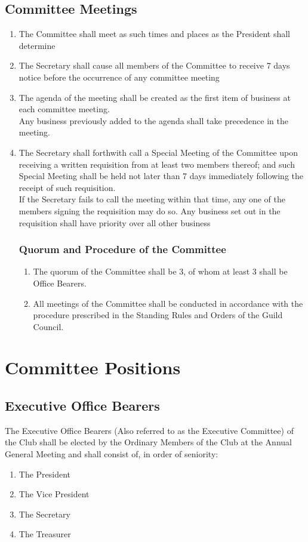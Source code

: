 \documentclass[10pt,a4paper]{report}
\begin{document}
	\section{Committee Meetings}
	\begin{enumerate}[label=\alph*]
		\item The Committee shall meet as such times and places as the President shall determine
		\item The Secretary shall cause all members of the Committee to receive 7 days notice before the occurrence of any committee meeting
		\item The agenda of the meeting shall be created as the first item of business at each committee meeting. \\
		Any business previously added to the agenda shall take precedence in the meeting.
		\item The Secretary shall forthwith call a Special Meeting of the Committee upon receiving a written requisition from at least two members thereof; and such Special Meeting shall be held not later than 7 days immediately following the receipt of such requisition. \\
		If the Secretary fails to call the meeting within that time, any one of the members signing the requisition may do so. Any business set out in the requisition shall have priority over all other business
		\subsection{Quorum and Procedure of the Committee}
		\begin{enumerate}[label=\alph*]
		\item The quorum of the Committee shall be 3, of whom at least 3 shall be Office Bearers.
		\item All meetings of the Committee shall be conducted in accordance with the procedure prescribed in the Standing Rules and Orders of the Guild Council.
		\end{enumerate}
	\end{enumerate}

	\chapter{Committee Positions}
	\section{Executive Office Bearers}
	The Executive Office Bearers (Also referred to as the Executive Committee) of the Club shall be elected by the Ordinary Members of the Club at the Annual General Meeting and shall consist of, in order of seniority:
		\begin{enumerate}[label=\alph*]
			\item The President
			\item The Vice President
			\item The Secretary
			\item The Treasurer
		\end{enumerate}
\end{document}

